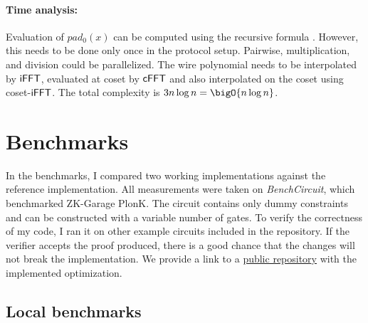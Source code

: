 \paragraph{Time analysis:} Evaluation of $pad_0(x)$ can be computed using the recursive formula . However, this needs to be done only once in the protocol setup. Pairwise, multiplication, and division could be parallelized. The wire polynomial needs to be interpolated by $\mathsf{iFFT}$, evaluated at coset by $\mathsf{cFFT}$ and also interpolated on the coset using coset-$\mathsf{iFFT}$. The total complexity is $3 n\log{n} = \bigO{n\log{n}}$.


\section{Benchmarks}
\label{benchmarks}

In the benchmarks, I compared two working implementations against the reference implementation. All measurements were taken on \textit{BenchCircuit}, which benchmarked ZK-Garage PlonK. The circuit contains only dummy constraints and can be constructed with a variable number of gates. To verify the correctness of my code, I ran it on other example circuits included in the repository. If the verifier accepts the proof produced, there is a good chance that the changes will not break the implementation. We provide a link to a \href{https://github.com/benbencik/plonk-polynomial-degree-reduction}{public repository} with the implemented optimization. 

\subsection{Local benchmarks}

